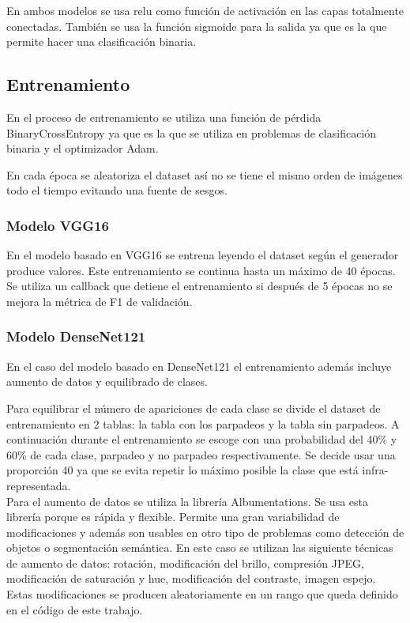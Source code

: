 \documentclass[12pt]{article}
\begin{document}
    En ambos modelos se usa relu como función de activación en las capas totalmente conectadas.
    También se usa la función sigmoide para la salida ya que es la que permite hacer una clasificación
    binaria.

    \subsection{Entrenamiento}
    En el proceso de entrenamiento se utiliza una función de pérdida BinaryCrossEntropy ya que es la que se utiliza
    en problemas de clasificación binaria y el optimizador Adam.

    En cada época se aleatoriza el dataset así no se tiene el mismo orden de imágenes todo el tiempo evitando una
    fuente de sesgos.

    \subsubsection{Modelo VGG16}
    En el modelo basado en VGG16 se entrena leyendo el dataset según el generador produce valores.
    Este entrenamiento se continua hasta un máximo de 40 épocas.
    Se utiliza un callback que detiene el entrenamiento si después de 5 épocas no se mejora la métrica de F1 de
    validación.

    \subsubsection{Modelo DenseNet121}
    En el caso del modelo basado en DenseNet121 el entrenamiento además incluye aumento de datos y equilibrado de
    clases.

    Para equilibrar el número de apariciones de cada clase se divide el dataset de entrenamiento en 2 tablas: la
    tabla con los parpadeos y la tabla sin parpadeos.
    A continuación durante el entrenamiento se escoge con una probabilidad del 40\% y 60\% de cada clase, parpadeo y
    no parpadeo respectivamente.
    Se decide usar una proporción 40 ya que se evita repetir lo máximo posible la clase que está infra-representada.
    \\

    Para el aumento de datos se utiliza la librería Albumentations\cite{albumentations}.
    Se usa esta librería porque es rápida y flexible.
    Permite una gran variabilidad de modificaciones y además son usables en otro tipo de problemas como detección de
    objetos o segmentación semántica.
    En este caso se utilizan las siguiente técnicas de aumento de datos: rotación, modificación del brillo,
    compresión JPEG, modificación de saturación y hue, modificación del contraste, imagen espejo.
    Estas modificaciones se producen aleatoriamente en un rango que queda definido en el código de este trabajo.
\end{document}
